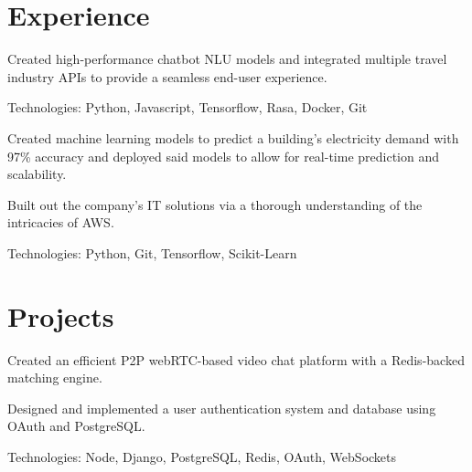 \documentclass[]{deedy-resume-openfont}
\begin{document}
%
%
\lastupdated

%
%

%
%

\begin{minipage}[t]{0.64\textwidth} 


\section{Experience}
\vspace{\topsep} %
\begin{tightemize}
    \item Created high-performance chatbot NLU models and integrated multiple travel 
    industry APIs to provide a seamless end-user experience.
    \item Technologies: Python, Javascript, Tensorflow, Rasa, Docker, Git
    \end{tightemize}
\sectionsep

\begin{tightemize}
\item Created machine learning models to predict a building's electricity demand with 97\% 
accuracy and deployed said models to allow for real-time prediction and scalability.
\item Built out the company's IT solutions via a thorough understanding of the intricacies of AWS. 
\item Technologies: Python, Git, Tensorflow, Scikit-Learn
\end{tightemize}
\sectionsep

\section{Projects}
\descript{}
\location{}
\begin{tightemize} 
    \item Created an efficient P2P webRTC-based video chat platform  with a Redis-backed 
    matching engine.
    \item Designed and implemented a user authentication system and database using OAuth
    and PostgreSQL.
    \item Technologies: Node, Django, PostgreSQL, Redis, OAuth, WebSockets
\end{tightemize}
\sectionsep


\end{minipage}
\end{document}
